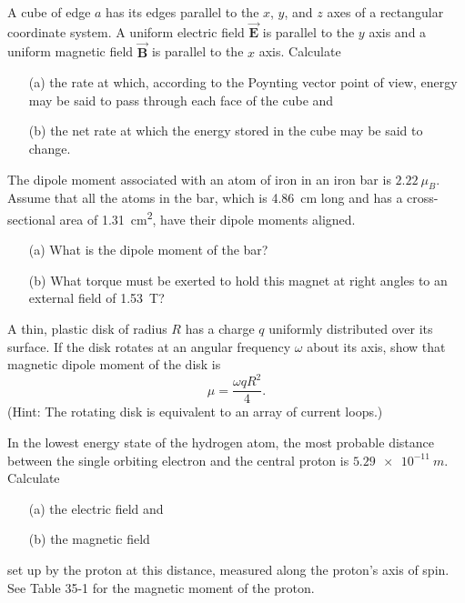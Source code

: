 \documentclass[12pt,letterpaper,boxed,cm]{hmcpset}
\newcommand{\f}[2]{\frac{#1}{#2}}
\begin{document}


\begin{problem}[38-P5*]
	A cube of edge $a$ has its edges parallel to the $x$, $y$, and $z$ axes of a rectangular coordinate system. A uniform electric field $\vec{\mathbf{E}}$ is parallel to the $y$ axis and a uniform magnetic field $\vec{\mathbf{B}}$ is parallel to the $x$ axis. Calculate
	\begin{enumerate}
		\item[(a)] the rate at which, according to the Poynting vector point of view, energy may be said to pass through each face of the cube and
		\item[(b)] the net rate at which the energy stored in the cube may be said to change. 
	\end{enumerate}	
\end{problem}
\begin{solution}
\end{solution}
\newpage


\begin{problem}[35-E12]
	The dipole moment associated with an atom of iron in an iron bar is $\SI{2.22}{\mu_B}$. Assume that all the atoms in the bar, which is \SI{4.86}{cm} long and has a cross-sectional area of \SI{1.31}{cm^2}, have their dipole moments aligned.
	\begin{enumerate}
		\item[(a)] What is the dipole moment of the bar?
		\item[(b)] What torque must be exerted to hold this magnet at right angles to an external field of \SI{1.53}{T}? 
	\end{enumerate}
\end{problem}
\begin{solution}
\end{solution}
\newpage

\begin{problem}[35-P1]
	A thin, plastic disk of radius $R$ has a charge $q$ uniformly distributed over its surface. If the disk rotates at an angular frequency $\omega$ about its axis, show that magnetic dipole moment of the disk is
	\[
		\mu = \f{\omega qR^2}{4}.
	\]
	(Hint: The rotating disk is equivalent to an array of current loops.)
\end{problem}
\begin{solution}
\end{solution}
\newpage

\begin{problem}[35-E9]
	In the lowest energy state of the hydrogen atom, the most probable distance between the single orbiting electron and the central proton is $\SI{5.29e-11}{m}$. Calculate
	\begin{enumerate}
		\item[(a)] the electric field and
		\item[(b)] the magnetic field 
	\end{enumerate}
	set up by the proton at this distance, measured along the proton's axis of spin. See Table 35-1 for the magnetic moment of the proton.
\end{problem}
\begin{solution}
\end{solution}
\end{document}
